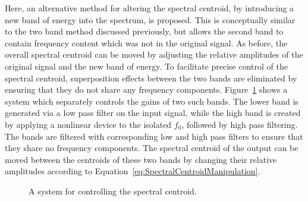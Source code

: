			Here, an alternative method for altering the spectral centroid, by introducing a new band of energy
			into the spectrum, is proposed. This is conceptually similar to the two band method discussed
			previously, but allows the second band to contain frequency content which was not in the original
			signal. As before, the overall spectral centroid can be moved by adjusting the relative amplitudes
			of the original signal and the new band of energy. To facilitate precise control of the spectral
			centroid, superposition effects between the two bands are eliminated by ensuring that they do not
			share any frequency components.  Figure~\ref{fig:TwoBandSpectralCentroidSystem} shows a system
			which separately controls the gains of two such bands. The lower band is generated via a low pass
			filter on the input signal, while the high band is created by applying a nonlinear device to the
			isolated $f_{0}$, followed by high pass filtering. The bands are filtered with corresponding low
			and high pass filters to ensure that they share no frequency components. The spectral centroid of
			the output can be moved between the centroids of these two bands by changing their relative
			amplitudes according to Equation~\ref{eq:SpectralCentroidManipulation}.

			\begin{figure}[h!]
				\centering
				\caption{A system for controlling the spectral centroid.}
				\label{fig:TwoBandSpectralCentroidSystem}
			\end{figure}

